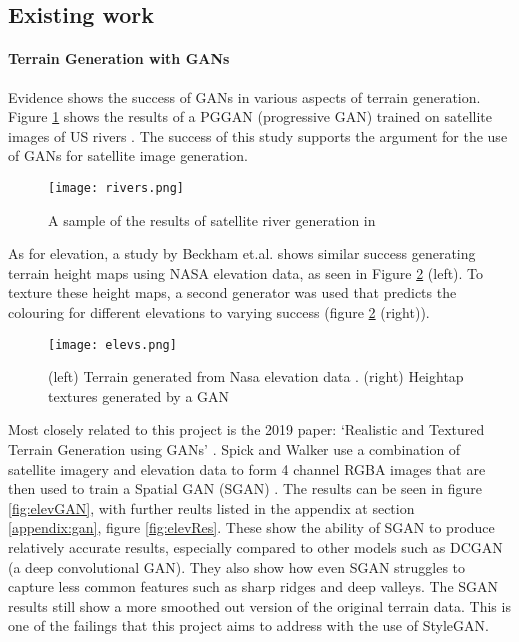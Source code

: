 \documentclass[a4paper]{report}
\begin{document}
\subsection{Existing work}
\paragraph{Terrain Generation with GANs}
Evidence shows the success of GANs in various aspects of terrain generation. Figure \ref{fig:rivers} shows the results of a PGGAN (progressive GAN) trained on satellite images of US rivers \cite{riverSat}. The success of this study supports the argument for the use of GANs for satellite image generation.

\begin{figure}[H]
    \centering
        \texttt{[image: rivers.png]}
        \caption{A sample of the results of satellite river generation in \cite{riverSat}}
        \label{fig:rivers}
\end{figure}

As for elevation, a study by Beckham et.al.\cite{beckham2017step} shows similar success generating terrain height maps using NASA elevation data, as seen in Figure \ref{fig:elevs} (left). To texture these height maps, a second generator was used that predicts the colouring for different elevations to varying success (figure \ref{fig:elevs} (right)).

\begin{figure}[H]
    \centering
        \texttt{[image: elevs.png]}
        \caption{(left) Terrain generated from Nasa elevation data \cite{beckham2017step}. (right) Heightap textures generated by a GAN \cite{beckham2017step}}
        \label{fig:elevs}
\end{figure}

Most closely related to this project is the 2019 paper: `Realistic and Textured Terrain Generation using GANs' \cite{spick}. Spick and Walker use a combination of satellite imagery and elevation data to form 4 channel RGBA images that are then used to train a Spatial GAN (SGAN) \cite{sgan}. The results can be seen in figure \ref{fig:elevGAN}, with further reults listed in the appendix at section \ref{appendix:gan}, figure \ref{fig:elevRes}. These show the ability of SGAN to produce relatively accurate results, especially compared to other models such as DCGAN (a deep convolutional GAN). They also show how even SGAN struggles to capture less common features such as sharp ridges and deep valleys. The SGAN results still show a more smoothed out version of the original terrain data. This is one of the failings that this project aims to address with the use of StyleGAN. 
\end{document}
